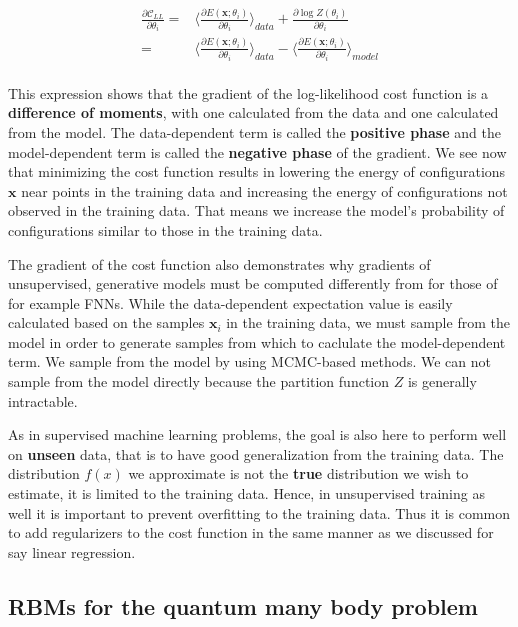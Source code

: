 \documentclass[%
oneside,                 %
final,                   %
10pt]{article}
\begin{document}
\begin{align}
	\frac{\partial \mathcal{C}_{LL}}{\partial \theta_i}
	=& \langle \frac{ \partial E(\bm{x}; \theta_i) } { \partial \theta_i} \rangle_{data} + \frac{\partial \log Z(\theta_i)}{ \partial  \theta_i} \\
	=& \langle \frac{ \partial E(\bm{x}; \theta_i) } { \partial \theta_i} \rangle_{data} - \langle \frac{ \partial E(\bm{x}; \theta_i) } { \partial \theta_i} \rangle_{model} \\
\end{align}

This expression shows that the gradient of the log-likelihood cost
function is a \textbf{difference of moments}, with one calculated from
the data and one calculated from the model. The data-dependent term is
called the \textbf{positive phase} and the model-dependent term is
called the \textbf{negative phase} of the gradient. We see now that
minimizing the cost function results in lowering the energy of
configurations $\bm{x}$ near points in the training data and
increasing the energy of configurations not observed in the training
data. That means we increase the model's probability of configurations
similar to those in the training data.

The gradient of the cost function also demonstrates why gradients of
unsupervised, generative models must be computed differently from for
those of for example FNNs. While the data-dependent expectation value
is easily calculated based on the samples $\bm{x}_i$ in the training
data, we must sample from the model in order to generate samples from
which to caclulate the model-dependent term. We sample from the model
by using MCMC-based methods. We can not sample from the model directly
because the partition function $Z$ is generally intractable.

As in supervised machine learning problems, the goal is also here to
perform well on \textbf{unseen} data, that is to have good
generalization from the training data. The distribution $f(x)$ we
approximate is not the \textbf{true} distribution we wish to estimate,
it is limited to the training data. Hence, in unsupervised training as
well it is important to prevent overfitting to the training data. Thus
it is common to add regularizers to the cost function in the same
manner as we discussed for say linear regression.

\subsection*{RBMs for the quantum many body problem}
\end{document}
